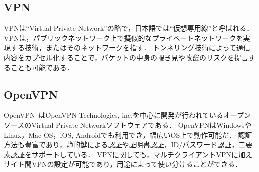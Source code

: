 \subsection{VPN}

VPNは``Virtual Private Network''の略で，日本語では``仮想専用線''と呼ばれる．
VPNは，パブリックネットワーク上で擬似的なプライベートネットワークを実現する技術，またはそのネットワークを指す．
トンネリング技術によって通信内容をカプセル化することで，パケットの中身の覗き見や改竄のリスクを提言することも可能である．

\subsection{OpenVPN}

OpenVPN~\cite{OpenVPN}はOpenVPN Technologies, inc.を中心に開発が行われているオープンソースのVirtual Private Networkソフトウェアである．
OpenVPNはWindowsやLinux，Mac OS，iOS, Androidでも利用でき，幅広いOS上で動作可能だ．
認証方法も豊富であり，静的鍵による認証や証明書認証，ID/パスワード認証，二要素認証をサポートしている．
VPNに関しても，マルチクライアントVPNに加えサイト間VPNの設定が可能であり，用途によって使い分けることができる．